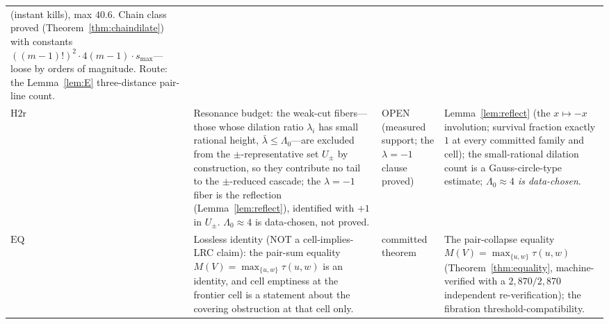 \documentclass[11pt,a4paper]{article}
\numberwithin{equation}{section}
\theoremstyle{plain}
\theoremstyle{definition}
\theoremstyle{remark}
\begin{document}
{\begin{longtable}{@{}p{}p{}
                   p{}p{}@{}}
(instant kills), max $40.6$. Chain class proved
(Theorem~\ref{thm:chaindilate}) with constants $((m-1)!)^2\cdot 4(m-1)\cdot
s_{\max}$---loose by orders of magnitude. Route: the
Lemma~\ref{lem:E} three-distance pair-line count. \\
$\mathrm{H2r}$ &
Resonance budget: the weak-cut fibers---those whose dilation ratio
$\lambda_i$ has small rational height, $\bar\lambda\le\Lambda_0$---are
excluded from the $\pm$-representative set $U_\pm$ by construction, so they
contribute no tail to the $\pm$-reduced cascade; the $\lambda=-1$ fiber is
the reflection (Lemma~\ref{lem:reflect}), identified with $+1$ in $U_\pm$.
$\Lambda_0\approx 4$ is data-chosen, not proved. &
OPEN (measured support; the $\lambda=-1$ clause proved) &
Lemma~\ref{lem:reflect} (the $x\mapsto-x$ involution; survival fraction
exactly $1$ at every committed family and cell); the small-rational
dilation count is a Gauss-circle-type estimate;
\emph{$\Lambda_0\approx 4$ is data-chosen}. \\
$\mathrm{EQ}$ &
Lossless identity (NOT a cell-implies-LRC claim): the pair-sum equality
$M(V)=\max_{\{u,w\}}\tau(u,w)$ is an identity, and cell emptiness at the
frontier cell is a statement about the covering obstruction at that cell
only. &
committed theorem &
The pair-collapse equality
$M(V)=\max_{\{u,w\}}\tau(u,w)$ (Theorem~\ref{thm:equality},
machine-verified with a $2{,}870/2{,}870$ independent re-verification);
the fibration threshold-compatibility. \\
\end{longtable}
}
\end{document}
